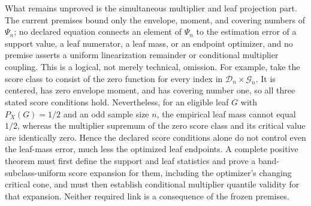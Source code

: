 What remains unproved is the simultaneous multiplier and leaf projection
part.  The current premises bound only the envelope, moment, and covering
numbers of \(\Psi_n\); no declared equation connects an element of
\(\Psi_n\) to the estimation error of a support value, a leaf numerator, a
leaf mass, or an endpoint optimizer, and no premise asserts a uniform
linearization remainder or conditional multiplier coupling.  This is a
logical, not merely technical, omission.  For example, take the score class
to consist of the zero function for every index in
\(\mathcal D_n\times\mathcal G_n\).  It is centered, has zero envelope
moment, and has covering number one, so all three stated score conditions
hold.  Nevertheless, for an eligible leaf \(G\) with \(P_X(G)=1/2\) and an
odd sample size \(n\), the empirical leaf mass cannot equal \(1/2\), whereas
the multiplier supremum of the zero score class and its critical value are
identically zero.  Hence the declared score conditions alone do not control
even the leaf-mass error, much less the optimized leaf endpoints.  A complete
positive theorem must first define the support and leaf statistics and prove
a band-subclass-uniform score expansion for them, including the optimizer's
changing critical cone, and must then establish conditional multiplier
quantile validity for that expansion.  Neither required link is a consequence
of the frozen premises.
